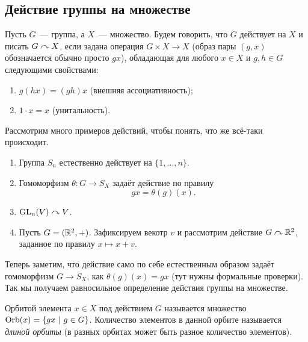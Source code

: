 	
	\subsection{Действие группы на множестве}

	\begin{definition} 
		Пусть $G$~--- группа, а $X$~--- множество. Будем говорить, что $G$ действует на $X$ и писать $G \curvearrowright X$, если задана операция $G \times X \to X$ (образ пары $(g, x)$обозначается обычно просто $gx$), обладающая для любого $x \in X$ и $g, h \in G$ следующими свойствами:

		\begin{enumerate}
			\item $g(hx) = (gh)x$ (внешняя ассоциативность);
			\item $1 \cdot x = x$ (унитальность).
		\end{enumerate}
	\end{definition}

	\begin{example}
		Рассмотрим много примеров действий, чтобы понять, что же всё-таки происходит. 

		\begin{enumerate}
			\item Группа $S_n$ естественно действует на $\{ 1, \ldots, n \}$. 
			\item Гомоморфизм $\theta \colon G \to S_{X}$ задаёт действие по правилу
			\[
				gx = \theta(g)(x).
			\]
			\item $\mathrm{GL}_{n}(V) \curvearrowright V$. 

			\item Пусть $G = (\mathbb{R}^2, +)$. Зафиксируем векотр $v$ и рассмотрим действие $G \curvearrowright \mathbb{R}^2$, заданное по правилу $x \mapsto x + v$.
		\end{enumerate}
	\end{example}

	Теперь заметим, что действие само по себе естественным образом задаёт гомоморфизм $G \to S_{X}$, как $\theta(g)(x) = gx$ (тут нужны формальные проверки). Так мы получаем равносильное определение действия группы на множестве.  

	\begin{definition} 
		Орбитой элемента $x \in X$ под действием $G$ называется множество $\operatorname{Orb}(x) = \{ gx \ \vert \  g \in G \}$. Количество элементов в данной орбите называется \emph{длиной орбиты} (в разных орбитах может быть разное количество элементов).
	\end{definition}

